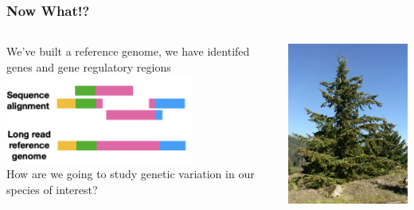 \documentclass{beamer}
\begin{document}
\begin{frame}
\frametitle{Now What!?}
\begin{columns}
	\begin{column}{0.5\textwidth}
		We've built a reference genome, we have identifed genes and gene regulatory regions\\
			\vspace{15pt}
						\includegraphics[keepaspectratio, width  = 0.7\textwidth]{img/referenceGenome}\\ 
			\vspace{15pt}
		How are we going to study genetic variation in our species of interest?
	\end{column}
	\begin{column}{0.5\textwidth}
	\includegraphics[keepaspectratio, width  = \textwidth]{img/doug-fir}\\ 
	\end{column}
\end{columns}
		
\end{frame}
	
\end{document}
